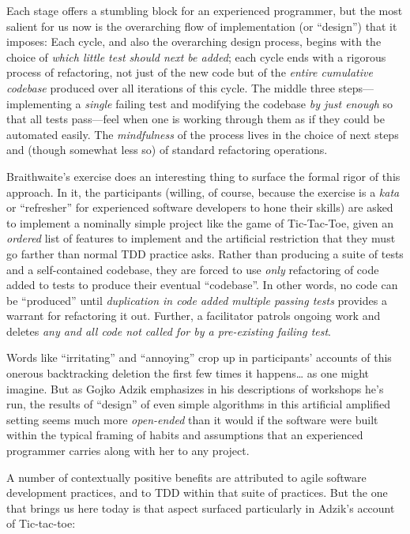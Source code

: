 Each stage offers a stumbling block for an experienced programmer, but the most salient for us now is the overarching flow of implementation (or ``design'') that it imposes: Each cycle, and also the overarching design process, begins with the choice of \emph{which little test should next be added}; each cycle ends with a rigorous process of refactoring, not just of the new code but of the \emph{entire cumulative codebase} produced over all iterations of this cycle. The middle three steps---implementing a \emph{single} failing test and modifying the codebase \emph{by just enough} so that all tests pass---feel when one is working through them as if they could be automated easily. The \emph{mindfulness} of the process lives in the choice of next steps and (though somewhat less so) of standard refactoring operations.

Braithwaite's exercise does an interesting thing to surface the formal rigor of this approach. In it, the participants (willing, of course, because the exercise is a \emph{kata} or ``refresher'' for experienced software developers to hone their skills) are asked to implement a nominally simple project like the game of Tic-Tac-Toe, given an \emph{ordered} list of features to implement and the artificial restriction that they must go farther than normal TDD practice asks. Rather than producing a suite of tests and a self-contained codebase, they are forced to use \emph{only} refactoring of code added to tests to produce their eventual ``codebase''. In other words, no code can be ``produced'' until \emph{duplication in code added multiple passing tests} provides a warrant for refactoring it out. Further, a facilitator patrols ongoing work and deletes \emph{any and all code not called for by a pre-existing failing test}.

Words like ``irritating'' and ``annoying'' crop up in participants' accounts of  this onerous backtracking deletion the first few times it happens\ldots{} as one might imagine. But as Gojko Adzik emphasizes in his descriptions of workshops he's run, the results of ``design'' of even simple algorithms in this artificial amplified setting seems much more \emph{open-ended} than it would if the software were built within the typical framing of habits and assumptions that an experienced programmer carries along with her to any project.

A number of contextually positive benefits are attributed to agile software development practices, and to TDD within that suite of practices. But the one that brings us here today is that aspect surfaced particularly in Adzik's account of Tic-tac-toe:

